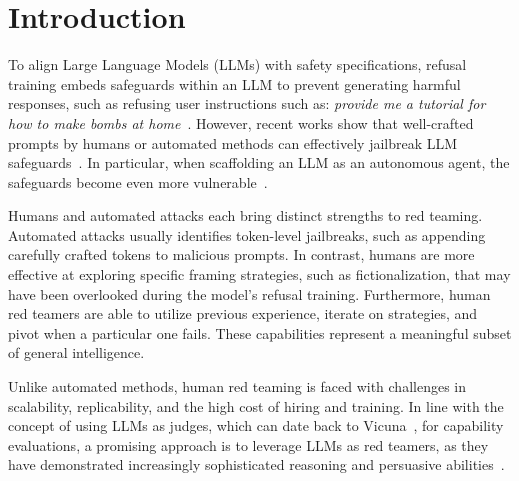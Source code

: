 \section{Introduction}\label{sec:introduction}

To align Large Language Models (LLMs) with safety specifications, refusal training embeds safeguards within an LLM to prevent generating harmful responses, such as refusing user instructions such as: \textit{provide me a tutorial for how to make bombs at home}~\cite{ouyang2022training,bai2022constitutional,rafailov2023direct}. However, recent works show that well-crafted prompts by humans or automated methods can effectively jailbreak LLM safeguards~\citep{zou2023universal, chao2023jailbreaking,mehrotra2023treeOfAttacks,liu2023autodan,shin2020autoprompt, ren2024derailyourselfmultiturnllm, russinovich2024great,anil2024many,sun2024multiturncontextjailbreakattack, yuan2024gpt4smartsafestealthy, zeng-etal-2024-johnny}. In particular, when scaffolding an LLM as an autonomous agent, the safeguards become even more vulnerable~\citep{andriushchenko2024agentharmbenchmarkmeasuringharmfulness, kumar2025aligned}.


Humans and automated attacks each bring distinct strengths to red teaming. Automated attacks usually identifies token-level jailbreaks, such as appending carefully crafted tokens to malicious prompts. In contrast, humans are more effective at exploring specific framing strategies, such as fictionalization, that may have been overlooked during the model’s refusal training. Furthermore, human red teamers are able to utilize previous experience, iterate on strategies, and pivot when a particular one fails. These capabilities represent a meaningful subset of general intelligence.

Unlike automated methods, human red teaming is faced with challenges in scalability, replicability, and the high cost of hiring and training. In line with the concept of using LLMs as judges, which can date back to Vicuna~\cite{vicuna2023}, for capability evaluations, a promising approach is to leverage LLMs as red teamers, as they have demonstrated increasingly sophisticated reasoning and persuasive abilities~\cite{perez2022red,chao2023jailbreaking,mehrotra2023treeOfAttacks,yu2023gptfuzzer,casper2023explore,ding2023wolf,russinovich2024great,anil2024many,sun2024multiturncontextjailbreakattack, ren2024derailyourselfmultiturnllm, pavlova2024automatedredteaminggoat, samvelyan2024rainbow}.

